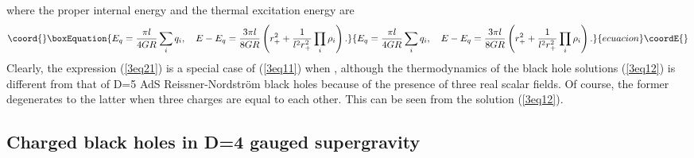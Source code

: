 \documentclass[a4paper,12pt]{article}
\begin{document}
where the proper internal energy \coordHE{} and the thermal excitation energy are 
\begin{equation}\coord{}\boxEquation{
E_q =\frac{\pi l}{4GR}\sum_i q_i, \ \ \ E-E_q=\frac{3\pi l}{8GR}\left (r_+^2 
  +\frac{1}{l^2 r_+^2}\prod_i \rho_i\right).
}{
E_q =\frac{\pi l}{4GR}\sum_i q_i, \ \ \ E-E_q=\frac{3\pi l}{8GR}\left (r_+^2 
  +\frac{1}{l^2 r_+^2}\prod_i \rho_i\right).
}{ecuacion}\coordE{}\end{equation}
Clearly, the expression (\ref{3eq21}) is a special case of (\ref{3eq11}) when
\coordHE{}, although the thermodynamics of the black hole solutions (\ref{3eq12}) is
different from that of D=5  AdS Reissner-Nordstr\"om black holes 
because of the presence of three real scalar fields. Of course, the former
degenerates to  the latter when three charges are equal to each other. This
can be seen from the solution (\ref{3eq12}).      




\subsection{Charged black holes in D=4 gauged supergravity}
\end{document}
